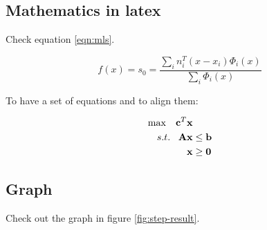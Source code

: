\documentclass[a4paper,11pt]{article}
\begin{document}
\subsection*{Mathematics in latex}
\label{sec:orge3a0d01}

Check equation \ref{eqn:mls}.

\begin{equation}
\label{eqn:mls}
f(x) = {s_0} = \frac{{\sum\limits_i {n_i^T(x - {x_i}){\Phi _i}(x)} }}{{\sum\limits_i {{\Phi _i}(x)} }}
\end{equation}

To have a set of equations and to align them:

\begin{equation}
\begin{array}{l}
\begin{split}
\max \;\;\; {{\bf{c}}^T}{\bf{x}} & \\
s.t. \;\;\; {\bf{Ax}} & \le {\bf{b}} \\
{\bf{x}} & \ge {\bf{0}}
\end{split}
\end{array}
\end{equation}

\subsection*{Graph}
\label{sec:orgfee3966}

Check out the graph in figure \ref{fig:step-result}.
\end{document}
